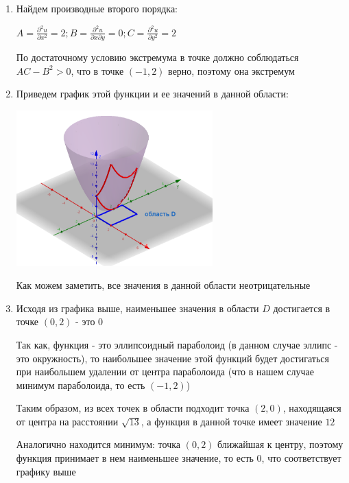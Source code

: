 \begin{enumerate}[label=\Alph*.]
\begin{enumerate}[label=\arabic*.]
        \item Найдем производные второго порядка:

        $A = \frac{\partial^2 u}{\partial x^2} = 2; B = \frac{\partial^2 u}{\partial x \partial y} = 0; C = \frac{\partial^2 u}{\partial y^2} = 2$

        По достаточному условию экстремума в точке должно соблюдаться $AC - B^2 > 0$, что в точке $(-1, 2)$ верно, поэтому она экстремум

        \item Приведем график этой функции и ее значений в данной области:

        \includegraphics[height=60mm]{images/2b1}

        Как можем заметить, все значения в данной области неотрицательные

        \item Исходя из графика выше, наименьшее значения в области $D$ достигается в точке $(0, 2)$ - это $0$

        Так как, функция - это эллипсоидный параболоид (в данном случае эллипс - это окружность), то наибольшее значение
        этой функций будет достигаться при наибольшем удалении от центра параболоида (что в нашем случае минимум параболоида, то есть $(-1, 2)$)

        Таким образом, из всех точек в области подходит точка $(2, 0)$, находящаяся от центра на расстоянии $\sqrt{13}$,
        а функция в данной точке имеет значение $12$

        Аналогично находится минимум: точка $(0, 2)$ ближайшая к центру, поэтому функция принимает в нем наименьшее значение, то есть $0$, что соответствует графику выше
    \end{enumerate}

\end{enumerate}

\clearpage
